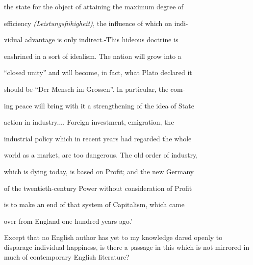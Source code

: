 \documentclass[11pt,openany]{book}
\begin{document}
the state for the object of attaining the maximum degree of

efficiency \emph{(Leistungsfiihigheit)}, the influence of which on indi-

vidual advantage is only indirect.-This hideous doctrine is

enshrined in a sort of idealism. The nation will grow into a

``closed unity'' and will become, in fact, what Plato declared it

should be-``Der Mensch im Grossen''. In particular, the com-

ing peace will bring with it a strengthening of the idea of State

action in industry.... Foreign investment, emigration, the

industrial policy which in recent years had regarded the whole

world as a market, are too dangerous. The old order of industry,

which is dying today, is based on Profit; and the new Germany

of the twentieth-century Power without consideration of Profit

is to make an end of that system of Capitalism, which came

over from England one hundred years ago.'

Except that no English author has yet to my knowledge dared openly to disparage individual happiness, is there a passage in this which is not mirrored in much of contemporary English literature?
\end{document}
